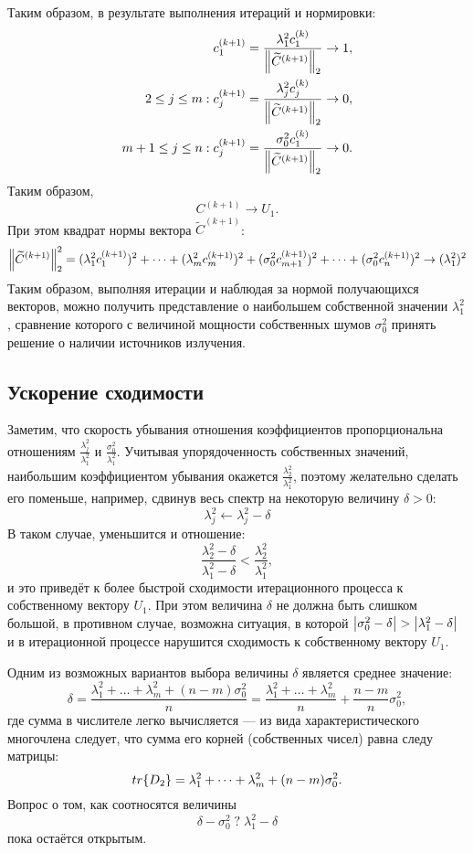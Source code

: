 Таким образом, в результате выполнения итераций и нормировки:
\begin{align*}
                         & c_1^{(k+1)} = \frac{\lambda_1^2 c_1^{(k)}}{\left \| \widetilde{C}^{(k+1)} \right \|_{2}} \rightarrow 1, \\
    2 \le j \le m : \;   & c_j^{(k+1)} = \frac{\lambda_j^2 c_j^{(k)}}{\left \| \widetilde{C}^{(k+1)} \right \|_{2}} \rightarrow 0, \\
    m+1 \le j \le n : \; & c_j^{(k+1)} = \frac{\sigma_0^2 c_1^{(k)}}{\left \| \widetilde{C}^{(k+1)} \right \|_{2}} \rightarrow 0 .
\end{align*}
Таким образом,
\[
    C^{(k+1)} \rightarrow U_1 .
\]
При этом квадрат нормы вектора $\widetilde{C}^{(k+1)}$:
\[
    \left \| \widetilde{C}^{(k+1)} \right \|_{2}^2
    = (\lambda_1^2 c_1^{(k+1)})^2 + \dots + (\lambda_m^2 c_m^{(k+1)})^2 + (\sigma_0^2 c_{m+1}^{(k+1)})^2 + \dots + (\sigma_0^2 c_n^{(k+1)})^2
    \rightarrow (\lambda_1^2)^2
\]
Таким образом, выполняя итерации и наблюдая за нормой получающихся векторов, можно получить представление о наибольшем собственной значении $\lambda_1^2$, сравнение которого с
величиной мощности собственных шумов $\sigma_0^2$ принять решение о наличии источников излучения.

\subsection{Ускорение сходимости}
Заметим, что скорость убывания отношения коэффициентов пропорциональна отношениям $\frac{\lambda_j^2}{\lambda_1^2}$ и $\frac{\sigma_0^2}{\lambda_1^2}$. Учитывая упорядоченность
собственных значений, наибольшим коэффициентом убывания окажется $\frac{\lambda_2^2}{\lambda_1^2}$, поэтому желательно сделать его поменьше, например, сдвинув весь спектр на
некоторую величину $\delta>0$:
\[
    \lambda_j^2 \leftarrow \lambda_j^2 - \delta
\]
В таком случае, уменьшится и отношение:
\[
    \frac{\lambda_2^2 - \delta}{\lambda_1^2 - \delta} < \frac{\lambda_2^2}{\lambda_1^2} ,
\]
и это приведёт к более быстрой сходимости итерационного процесса к собственному вектору $U_1$.
При этом величина $\delta$ не должна быть слишком большой, в противном случае, возможна ситуация, в которой $\left | \sigma_0^2 - \delta \right | > \left | \lambda_1^2 - \delta \right |$ и
в итерационной процессе нарушится сходимость к собственному вектору $U_1$.

Одним из возможных вариантов выбора величины $\delta$ является среднее значение:
\[
    \delta
    = \frac{\lambda_1^2 + \dots + \lambda_m^2 + (n-m) \sigma_0^2}{n}
    = \frac{\lambda_1^2 + \dots + \lambda_m^2}{n} + \frac{n-m}{n} \sigma_0^2,
\]
где сумма в числителе легко вычисляется --- из вида характеристического многочлена следует, что сумма его корней (собственных чисел) равна следу матрицы:
\[
    tr \{ D_2 \} = \lambda_1^2 + \dots + \lambda_m^2 + (n-m) \sigma_0^2 .
\]
Вопрос о том, как соотносятся величины
\[
    \delta - \sigma_0^2 \; ? \; \lambda_1^2 - \delta
\]
пока остаётся открытым.

